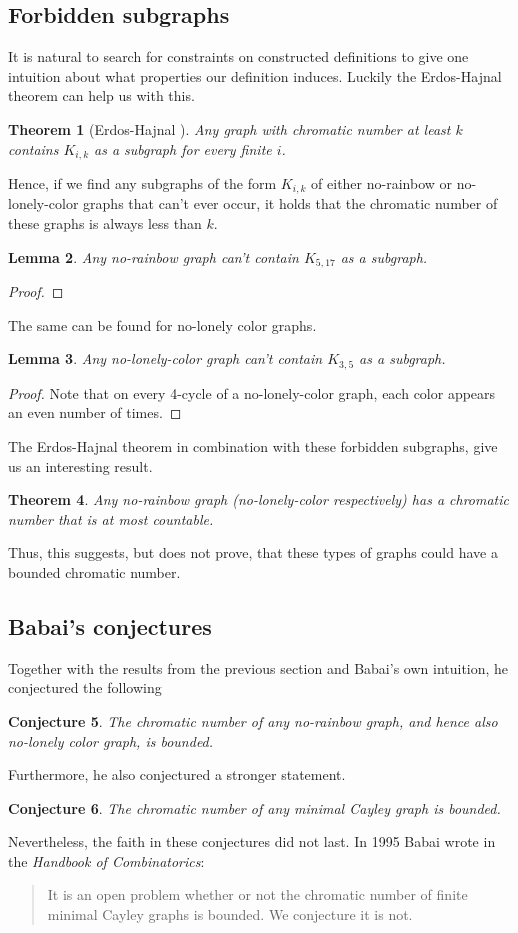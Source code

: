 \documentclass[a4paper,10pt]{article}
\numberwithin{equation}{section}
\newtheorem{theorem}{Theorem}[section]
\newtheorem{lemma}[theorem]{Lemma}
\newtheorem{conjecture}[theorem]{Conjecture}
\theoremstyle{definition}
\begin{document}
\subsection{Forbidden subgraphs}
    It is natural to search for constraints on constructed definitions to give one intuition about what properties our definition induces. Luckily the Erdos-Hajnal theorem can help us with this.
    \begin{theorem}[Erdos-Hajnal \cite{ErdosHajnal1966}]
        Any graph with chromatic number at least \(k\) contains \(K_{i,k}\) as a subgraph for every finite \(i\).
    \end{theorem}
    Hence, if we find any subgraphs of the form \(K_{i, k}\) of either no-rainbow or no-lonely-color graphs that can't ever occur, it holds that the chromatic number of these graphs is always less than \(k\).
    \begin{lemma}
        Any no-rainbow graph can't contain \(K_{5,17}\) as a subgraph.
    \end{lemma}
    \begin{proof}
        
    \end{proof}
    The same can be found for no-lonely color graphs.
    \begin{lemma}
        Any no-lonely-color graph can't contain \(K_{3,5}\) as a subgraph.
    \end{lemma}
    \begin{proof}
        Note that on every 4-cycle of a no-lonely-color graph, each color appears an even number of times.
    \end{proof}
    The Erdos-Hajnal theorem in combination with these forbidden subgraphs, give us an interesting result.
    \begin{theorem}
        Any no-rainbow graph (no-lonely-color respectively) has a chromatic number that is at most countable.
    \end{theorem}
    Thus, this suggests, but does not prove, that these types of graphs could have a bounded chromatic number.
\subsection{Babai's conjectures}
    Together with the results from the previous section and Babai's own intuition, he conjectured the following
    \begin{conjecture}
        The chromatic number of any no-rainbow graph, and hence also no-lonely color graph, is bounded.
    \end{conjecture}
    Furthermore, he also conjectured a stronger statement.
    \begin{conjecture}
        The chromatic number of any minimal Cayley graph is bounded.
    \end{conjecture}
    Nevertheless, the faith in these conjectures did not last. In 1995 Babai wrote in the \emph{Handbook of Combinatorics}:
    \begin{quote}
        It is an open problem whether or not the chromatic number of finite minimal Cayley graphs is bounded. We conjecture it is not.
        \cite{Babai1995}
    \end{quote}
    
\end{document}
